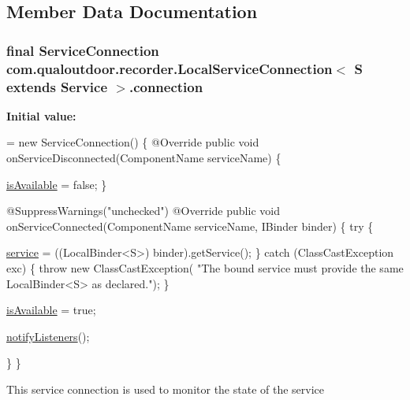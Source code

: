 \subsection{Member Data Documentation}
\hypertarget{classcom_1_1qualoutdoor_1_1recorder_1_1LocalServiceConnection_3_01S_01extends_01Service_01_4_ae4d85a721382a87cb0df327e7fae8722}{
\subsubsection[{connection}]{\setlength{\rightskip}{0pt plus 5cm}final Service\-Connection com.\-qualoutdoor.\-recorder.\-Local\-Service\-Connection$<$ S extends Service $>$.connection\hspace{0.3cm}{\ttfamily [private]}}}\label{classcom_1_1qualoutdoor_1_1recorder_1_1LocalServiceConnection_3_01S_01extends_01Service_01_4_ae4d85a721382a87cb0df327e7fae8722}
{\bfseries Initial value\-:}
\begin{DoxyCode}
= \textcolor{keyword}{new} ServiceConnection() \{
        @Override
        \textcolor{keyword}{public} \textcolor{keywordtype}{void} onServiceDisconnected(ComponentName serviceName) \{
            
            \hyperlink{classcom_1_1qualoutdoor_1_1recorder_1_1LocalServiceConnection_3_01S_01extends_01Service_01_4_add998e9cac132822c3c72265d85aacc8}{isAvailable} = \textcolor{keyword}{false};
        \}

        @SuppressWarnings(\textcolor{stringliteral}{"unchecked"})
        @Override
        \textcolor{keyword}{public} \textcolor{keywordtype}{void} onServiceConnected(ComponentName serviceName, IBinder binder) \{
            \textcolor{keywordflow}{try} \{
                
                \hyperlink{classcom_1_1qualoutdoor_1_1recorder_1_1LocalServiceConnection_3_01S_01extends_01Service_01_4_a499f27a81f1d6ca28fe96efd7a390694}{service} = ((LocalBinder<S>) binder).getService();
            \} \textcolor{keywordflow}{catch} (ClassCastException exc) \{
                \textcolor{keywordflow}{throw} \textcolor{keyword}{new} ClassCastException(
                        \textcolor{stringliteral}{"The bound service must provide the same LocalBinder<S> as declared."});
            \}
            
            \hyperlink{classcom_1_1qualoutdoor_1_1recorder_1_1LocalServiceConnection_3_01S_01extends_01Service_01_4_add998e9cac132822c3c72265d85aacc8}{isAvailable} = \textcolor{keyword}{true};
            
            \hyperlink{classcom_1_1qualoutdoor_1_1recorder_1_1LocalServiceConnection_3_01S_01extends_01Service_01_4_aae893747c6d559605c69a4a4ddaf0f24}{notifyListeners}();

        \}
    \}
\end{DoxyCode}
This service connection is used to monitor the state of the service 

